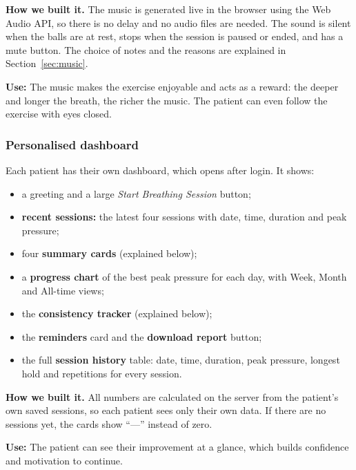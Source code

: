 \documentclass[12pt,a4paper]{article}
\begin{document}
\textbf{How we built it.} The music is generated live in the browser using the Web Audio API, so there is no delay and no audio files are needed. The sound is silent when the balls are at rest, stops when the session is paused or ended, and has a mute button. The choice of notes and the reasons are explained in Section~\ref{sec:music}.

\textbf{Use:} The music makes the exercise enjoyable and acts as a reward: the deeper and longer the breath, the richer the music. The patient can even follow the exercise with eyes closed.

\subsubsection{Personalised dashboard}
Each patient has their own dashboard, which opens after login. It shows:
\begin{itemize}
  \item a greeting and a large \emph{Start Breathing Session} button;
  \item \textbf{recent sessions:} the latest four sessions with date, time, duration and peak pressure;
  \item four \textbf{summary cards} (explained below);
  \item a \textbf{progress chart} of the best peak pressure for each day, with Week, Month and All-time views;
  \item the \textbf{consistency tracker} (explained below);
  \item the \textbf{reminders} card and the \textbf{download report} button;
  \item the full \textbf{session history} table: date, time, duration, peak pressure, longest hold and repetitions for every session.
\end{itemize}

\textbf{How we built it.} All numbers are calculated on the server from the patient's own saved sessions, so each patient sees only their own data. If there are no sessions yet, the cards show ``---'' instead of zero.

\textbf{Use:} The patient can see their improvement at a glance, which builds confidence and motivation to continue.
\end{document}
